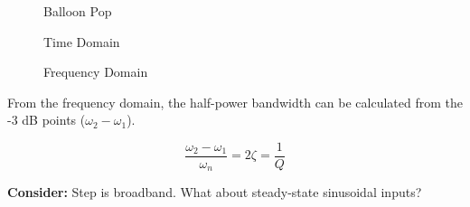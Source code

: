 \documentclass[10pt]{report}
\begin{document}
\begin{figure}[htb]
\begin{minipage}[b]{0.5\linewidth} 
\begin{center}
\caption{Balloon Pop}
\end{center}


\end{minipage}
\begin{minipage}[b]{0.5\linewidth} 
\begin{center}
\caption{Time Domain}
\end{center}

\end{minipage}
\end{figure}


\begin{figure}[htb]
\begin{center}
\caption{Frequency Domain}
\end{center}
\end{figure}

From the frequency domain, the half-power bandwidth can be calculated from the -3 dB points ($\omega_2 - \omega_1$).

\begin{equation} \dfrac{\omega_2 - \omega_1}{\omega_n} = 2\zeta = \dfrac{1}{Q} \end{equation}

{\bf Consider:} Step is broadband.  What about steady-state sinusoidal inputs?
\end{document}
